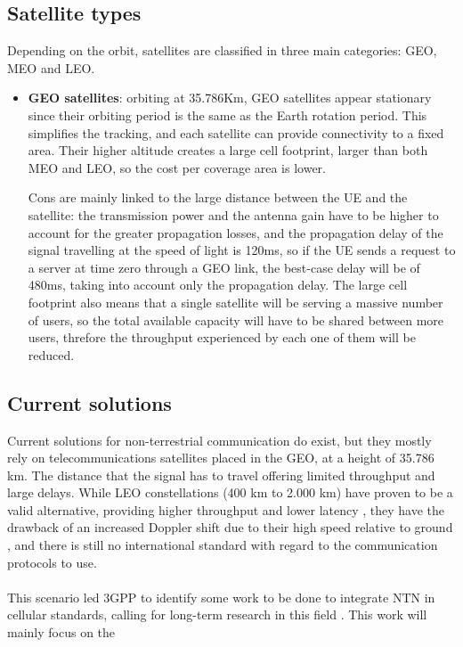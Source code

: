 \subsection{Satellite types}
Depending on the orbit, satellites are classified in three main categories: \ac{GEO}, \ac{MEO} and \ac{LEO}.
\begin{itemize}
    \item \textbf{\ac{GEO} satellites}: orbiting at 35.786Km, \ac{GEO} satellites appear stationary since their orbiting period is the same as the Earth rotation period. This simplifies the tracking, and each satellite can provide connectivity to a fixed area.
    Their higher altitude creates a large cell footprint, larger than both MEO and LEO, so the cost per coverage area is lower.

    Cons are mainly linked to the large distance between the \ac{UE} and the satellite: the transmission power and the antenna gain have to be higher to account for the greater propagation losses, and the propagation delay of the signal travelling at the speed of light is 120ms, so if the \ac{UE} sends a request to a server at time zero through a \ac{GEO} link, the best-case delay will be of 480ms, taking into account only the propagation delay.
    The large cell footprint also means that a single satellite will be serving a massive number of users, so the total available capacity will have to be shared between more users, threfore the throughput experienced by each one of them will be reduced.
\end{itemize}

\subsection{Current solutions}
Current solutions for non-terrestrial communication do exist, but they mostly rely on telecommunications satellites placed in the \ac{GEO}, at a height of 35.786 km. The distance that the signal has to travel offering limited throughput and large delays. While \ac{LEO} constellations (400 km to 2.000 km) have proven to be a valid alternative, providing higher throughput and lower latency \cite{main-features-5g-nr-ntn-yun}, they have the drawback of an increased Doppler shift due to their high speed relative to ground \cite{satellite-communication-mmwave-giordani}, and there is still no international standard with regard to the communication protocols to use. 

\paragraph{}
This scenario led \ac{3GPP} to identify some work to be done to integrate \ac{NTN} in cellular standards, calling for long-term research in this field \cite{satellite-communication-mmwave-giordani}. This work will mainly focus on the 

